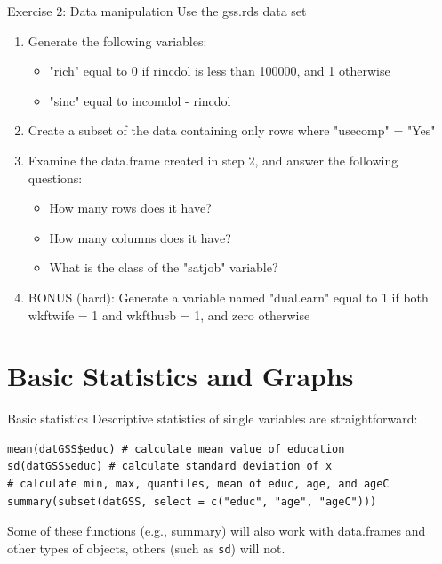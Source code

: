 \documentclass[table,smaller]{beamer}
\begin{document}
\begin{frame}[label=sec-6-7]{Exercise 2: Data manipulation}
Use the gss.rds data set

\begin{enumerate}
\item Generate the following variables:
\begin{itemize}
\item "rich" equal to 0 if rincdol is less than 100000, and 1 otherwise
\item "sinc" equal to incomdol - rincdol
\end{itemize}
\item Create a subset of the data containing only rows where "usecomp" = "Yes"
\item Examine the data.frame created in step 2, and answer the following questions:
\begin{itemize}
\item How many rows does it have?
\item How many columns does it have?
\item What is the class of the "satjob" variable?
\end{itemize}
\item BONUS (hard): Generate a variable named "dual.earn" equal to 1 if both wkftwife = 1 and wkfthusb = 1, and zero otherwise
\end{enumerate}
\end{frame}



\section{Basic Statistics and Graphs}
\label{sec-7}

\begin{frame}[fragile,label=sec-7-1]{Basic statistics}
 Descriptive statistics of single variables are straightforward:
\begin{verbatim}
mean(datGSS$educ) # calculate mean value of education
sd(datGSS$educ) # calculate standard deviation of x
# calculate min, max, quantiles, mean of educ, age, and ageC
summary(subset(datGSS, select = c("educ", "age", "ageC")))
\end{verbatim}


Some of these functions (e.g., summary) will also work with data.frames and other types of objects, others (such as \texttt{sd}) will not.
\end{frame}
\end{document}

